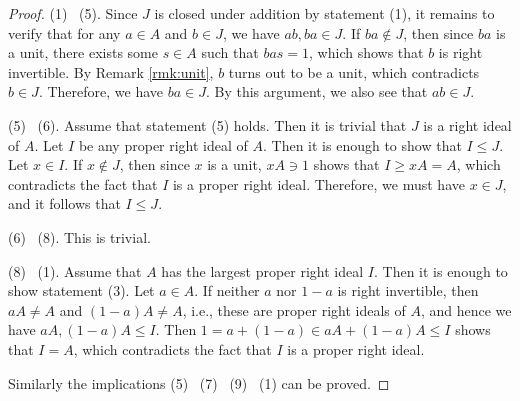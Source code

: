 \documentclass{surv-l}
\numberwithin{equation}{chapter}
\numberwithin{figure}{chapter}
\theoremstyle{plain}
\theoremstyle{definition}
\theoremstyle{remark}
\begin{document}
\begin{proof}
(1) \text{$\Rightarrow$}\  (5).
Since $J$ is closed under addition by statement (1),
it remains to verify that for any $a \in A$ and $b \in J$,
we have $ab, ba \in J$.
If $ba \not\in J$, then since $ba$ is a unit, there exists some $s \in A$ such that
$bas = 1$, which shows that $b$ is right invertible.
By Remark \ref{rmk:unit}, $b$ turns out to be a unit, which contradicts
$b \in J$.
Therefore, we have $ba \in J$.
By this argument, we also see that $ab \in J$.

(5) \text{$\Rightarrow$}\  (6).
Assume that statement (5) holds.
Then it is trivial that $J$ is a right ideal of $A$.
Let $I$ be any proper right ideal of $A$.
Then it is enough to show that $I \le J$.
Let $x \in I$.
If $x \not \in J$, then since $x$ is a unit,
$xA \ni 1$ shows that $I \ge xA = A$, which contradicts the fact
that $I$ is a proper right ideal.
Therefore, we must have $x \in J$, and it follows that $I \le J$.

(6) \text{$\Rightarrow$}\  (8). This is trivial.

(8) \text{$\Rightarrow$}\  (1).
Assume that $A$ has the largest proper right ideal $I$.
Then it is enough to show statement (3).
Let $a \in A$.
If neither $a$ nor $1-a$ is right invertible, then
$aA \ne A$ and $(1-a)A \ne A$, i.e.,
these are proper right ideals of $A$, and hence we have
$aA, (1-a)A \le I$.
Then $1 = a + (1-a) \in aA + (1-a)A \le I$ shows that
$I = A$, which contradicts the fact that $I$ is a proper right ideal.

Similarly the implications (5) \text{$\Rightarrow$}\  (7) \text{$\Rightarrow$}\  (9) \text{$\Rightarrow$}\  (1) can be proved.
\end{proof}
\end{document}
